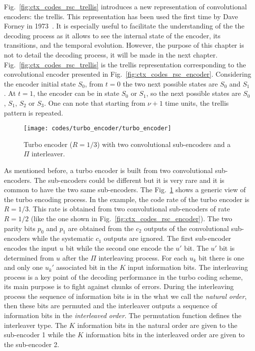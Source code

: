 Fig.~\ref{fig:ctx_codes_rsc_trellis} introduces a new representation of
convolutional encoders: the trellis. This representation has been used the first
time by Dave Forney in 1973~\cite{Forney1973}. It is especially useful to
facilitate the understanding of the the decoding process as it allows to see the
internal state of the encoder, its transitions, and the temporal evolution.
However, the purpose of this chapter is not to detail the decoding process, it
will be made in the next chapter. Fig.~\ref{fig:ctx_codes_rsc_trellis} is the
trellis representation corresponding to the convolutional encoder presented in
Fig.~\ref{fig:ctx_codes_rsc_encoder}. Considering the encoder initial state
$S_0$, from $t = 0$ the two next possible states are $S_0$ and $S_1$. At
$t = 1$, the encoder can be in state $S_0$ or $S_1$, so the next possible states
are $S_0$, $S_1$, $S_2$ or $S_3$. One can note that starting from $\nu +1$ time
units, the trellis pattern is repeated.

\begin{figure}[htp]
  \centering
  \texttt{[image: codes/turbo\_encoder/turbo\_encoder]}
  \caption{Turbo encoder ($R = 1/3$) with two convolutional sub-encoders and a
    $\Pi$ interleaver.}
  \label{fig:ctx_codes_turbo_encoder}
\end{figure}

As mentioned before, a turbo encoder is built from two convolutional
sub-encoders. The sub-encoders could be different but it is very rare and it is
common to have the two same sub-encoders. The
Fig.~\ref{fig:ctx_codes_turbo_encoder} shows a generic view of the turbo
encoding process. In the example, the code rate of the turbo encoder is
$R = 1/3$. This rate is obtained from two convolutional sub-encoders of rate
$R = 1/2$ (like the one shown in Fig.~\ref{fig:ctx_codes_rsc_encoder}). The two
parity bits $p_0$ and $p_1$ are obtained from the $c_2$ outputs of the
convolutional sub-encoders while the systematic $c_1$ outputs are ignored. The
first sub-encoder encodes the input $u$ bit while the second one encode the $u'$
bit. The $u'$ bit is determined from $u$ after the $\Pi$ interleaving process.
For each $u_k$ bit there is one and only one $u_k'$ associated bit in the $K$
input information bits. The interleaving process is a key point of the decoding
performance in the turbo coding scheme, its main purpose is to fight against
chunks of errors. During the interleaving process the sequence of information
bits is in the what we call the \emph{natural order}, then these bits are
permuted and the interleaver outputs a sequence of information bits in the
\emph{interleaved order}. The permutation function defines the interleaver type.
The $K$ information bits in the natural order are given to the sub-encoder 1
while the $K$ information bits in the interleaved order are given to the
sub-encoder 2.

